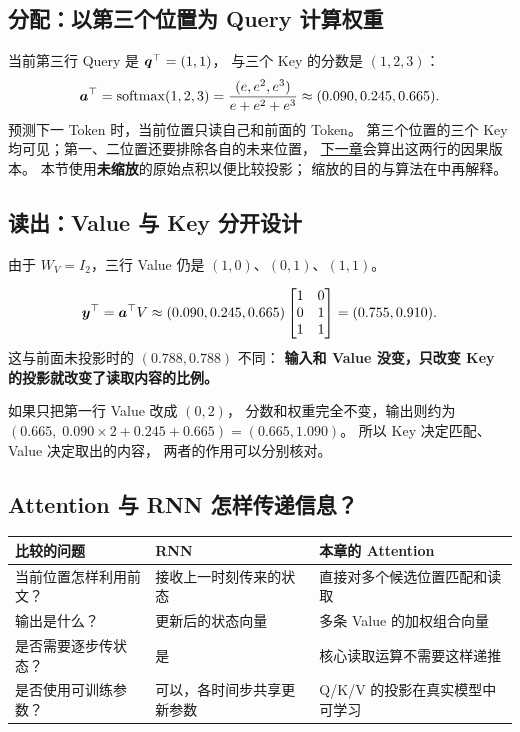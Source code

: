\subsection{分配：以第三个位置为 Query 计算权重}

当前第三行 Query 是 $\boldsymbol{q}^\top=(1,1)$，
与三个 Key 的分数是 $(1,2,3)$：
\[
\boldsymbol{a}^\top=\operatorname{softmax}(1,2,3)
=\frac{(e,e^2,e^3)}{e+e^2+e^3}
\approx(0.090,0.245,0.665).
\]
预测下一 Token 时，当前位置只读自己和前面的 Token。
第三个位置的三个 Key 均可见；第一、二位置还要排除各自的未来位置，
\hyperref[concept:causal-mask]{下一章}会算出这两行的因果版本。
本节使用\textbf{未缩放}的原始点积以便比较投影；
缩放的目的与算法在中再解释。

\subsection{读出：Value 与 Key 分开设计}

由于 $W_V=I_2$，三行 Value 仍是
$(1,0)$、$(0,1)$、$(1,1)$。
\begin{example}
\[
\boldsymbol{y}^\top=\boldsymbol{a}^\top V
\approx(0.090,0.245,0.665)
\begin{bmatrix}1&0\\0&1\\1&1\end{bmatrix}
=(0.755,0.910).
\]
这与前面未投影时的 $(0.788,0.788)$ 不同：
\textbf{输入和 Value 没变，只改变 Key 的投影就改变了读取内容的比例。}
\end{example}

如果只把第一行 Value 改成 $(0,2)$，
分数和权重完全不变，输出则约为
$(0.665,\;0.090\times2+0.245+0.665)=(0.665,1.090)$。
所以 Key 决定匹配、Value 决定取出的内容，
两者的作用可以分别核对。



\subsection{Attention 与 RNN 怎样传递信息？}

\begin{center}
\small
\renewcommand{\arraystretch}{1.35}
\begin{tabularx}{\linewidth}{@{}p{33mm}XX@{}}
\toprule
比较的问题 & RNN & 本章的 Attention\\
\midrule
当前位置怎样利用前文？ & 接收上一时刻传来的状态 & 直接对多个候选位置匹配和读取\\
输出是什么？ & 更新后的状态向量 & 多条 Value 的加权组合向量\\
是否需要逐步传状态？ & 是 & 核心读取运算不需要这样递推\\
是否使用可训练参数？ & 可以，各时间步共享更新参数 & Q/K/V 的投影在真实模型中可学习\\
\bottomrule
\end{tabularx}
\end{center}

